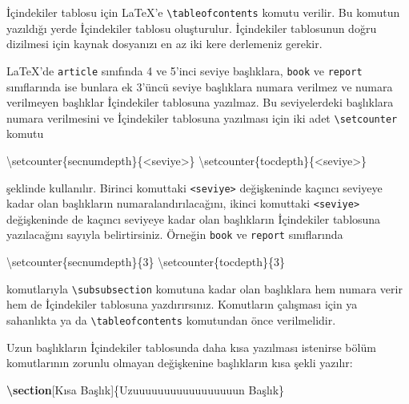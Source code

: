 \documentclass[
  10pt,
]{scrbook}
\newenvironment{Shaded}{\begin{snugshade}}{\end{snugshade}}
\newcommand{\FunctionTok}[1]{\textcolor[rgb]{0.00,0.00,0.00}{#1}}
\newcommand{\KeywordTok}[1]{\textcolor[rgb]{0.13,0.29,0.53}{\textbf{#1}}}
\newcommand{\NormalTok}[1]{#1}
\theoremstyle{definition}
\theoremstyle{definition}
\theoremstyle{definition}
\theoremstyle{definition}
\theoremstyle{remark}
\begin{document}
İçindekiler tablosu için LaTeX'e \texttt{\textbackslash{}tableofcontents} komutu verilir. Bu komutun yazıldığı yerde İçindekiler tablosu oluşturulur. İçindekiler tablosunun doğru dizilmesi için kaynak dosyanızı en az iki kere derlemeniz gerekir.

LaTeX'de \texttt{article} sınıfında 4 ve 5'inci seviye başlıklara, \texttt{book} ve \texttt{report} sınıflarında ise bunlara ek 3'üncü seviye başlıklara numara verilmez ve numara verilmeyen başlıklar İçindekiler tablosuna yazılmaz. Bu seviyelerdeki başlıklara numara verilmesini ve İçindekiler tablosuna yazılması için iki adet \texttt{\textbackslash{}setcounter} komutu

\begin{Shaded}
\begin{Highlighting}[]
\FunctionTok{\textbackslash{}setcounter}\NormalTok{\{secnumdepth\}\{\textless{}seviye\textgreater{}\}}
\FunctionTok{\textbackslash{}setcounter}\NormalTok{\{tocdepth\}\{\textless{}seviye\textgreater{}\}}
\end{Highlighting}
\end{Shaded}

şeklinde kullanılır. Birinci komuttaki \texttt{\textless{}seviye\textgreater{}} değişkeninde kaçıncı seviyeye kadar olan başlıkların numaralandırılacağını, ikinci komuttaki \texttt{\textless{}seviye\textgreater{}} değişkeninde de kaçıncı seviyeye kadar olan başlıkların İçindekiler tablosuna yazılacağını sayıyla belirtirsiniz. Örneğin \texttt{book} ve \texttt{report} sınıflarında

\begin{Shaded}
\begin{Highlighting}[]
\FunctionTok{\textbackslash{}setcounter}\NormalTok{\{secnumdepth\}\{3\}}
\FunctionTok{\textbackslash{}setcounter}\NormalTok{\{tocdepth\}\{3\}}
\end{Highlighting}
\end{Shaded}

komutlarıyla \texttt{\textbackslash{}subsubsection} komutuna kadar olan başlıklara hem numara verir hem de İçindekiler tablosuna yazdırırsınız. Komutların çalışması için ya sahanlıkta ya da \texttt{\textbackslash{}tableofcontents} komutundan önce verilmelidir.

Uzun başlıkların İçindekiler tablosunda daha kısa yazılması istenirse bölüm komutlarının zorunlu olmayan değişkenine başlıkların kısa şekli yazılır:

\begin{Shaded}
\begin{Highlighting}[]
\KeywordTok{\textbackslash{}section}\NormalTok{[Kısa Başlık]\{Uzuuuuuuuuuuuuuuuuun Başlık\}}
\end{Highlighting}
\end{Shaded}
\end{document}
